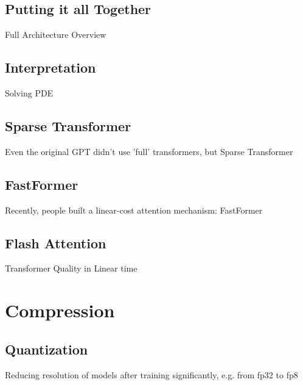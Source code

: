 \subsection{Putting it all Together}
\begin{frame}[c]
    Full Architecture Overview
\end{frame}

\subsection{Interpretation}
\begin{frame}[c]
    Solving PDE \cite{lu_understanding_2019}
\end{frame}

\subsection{Sparse Transformer}
\begin{frame}[c]
    Even the original GPT didn't use 'full' transformers, but Sparse Transformer \cite{child_generating_2019}
\end{frame}

\subsection{FastFormer}
\begin{frame}[c]
    Recently, people built a linear-cost attention mechanism: FastFormer \cite{wu_fastformer_2021}
\end{frame}

\subsection{Flash Attention}
\begin{frame}[c]
    Transformer Quality in Linear time \cite{hua_transformer_2022}
\end{frame}


\section{Compression}
\subsection{Quantization}
\begin{frame}[c]
    Reducing resolution of models after training significantly, e.g. from fp32 to fp8
\end{frame}

